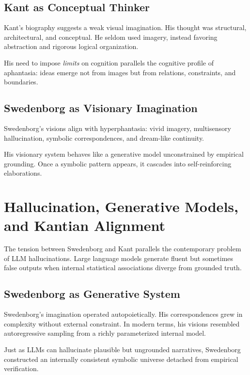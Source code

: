 \documentclass[12pt]{article}
\begin{document}
\subsection{Kant as Conceptual Thinker}

Kant’s biography suggests a weak visual imagination. His thought was 
structural, architectural, and conceptual. He seldom used imagery, instead 
favoring abstraction and rigorous logical organization.

His need to impose \emph{limits} on cognition parallels the cognitive profile 
of aphantasia: ideas emerge not from images but from relations, constraints, 
and boundaries.

\subsection{Swedenborg as Visionary Imagination}

Swedenborg’s visions align with hyperphantasia:  
vivid imagery, multisensory hallucination, symbolic correspondences, and 
dream-like continuity.

His visionary system behaves like a generative model unconstrained by 
empirical grounding. Once a symbolic pattern appears, it cascades into 
self-reinforcing elaborations.

\section{Hallucination, Generative Models, and Kantian Alignment}

The tension between Swedenborg and Kant parallels the contemporary problem of 
LLM hallucinations. Large language models generate fluent but sometimes false 
outputs when internal statistical associations diverge from grounded truth.

\subsection{Swedenborg as Generative System}

Swedenborg’s imagination operated autopoietically. His correspondences grew 
in complexity without external constraint. In modern terms, his visions 
resembled autoregressive sampling from a richly parameterized internal model.

Just as LLMs can hallucinate plausible but ungrounded narratives, Swedenborg 
constructed an internally consistent symbolic universe detached from empirical 
verification.
\end{document}

